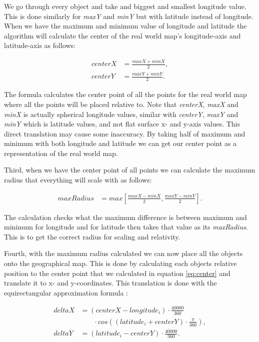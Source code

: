We go through every object and take and biggest and smallest longitude value. This is done similarly for \textit{maxY} and \textit{minY} but with latitude instead of longitude. When we have the maximum and minimum value of longitude and latitude the algorithm will calculate the center of the real world map's longitude-axis and latitude-axis as follows:

\begin{align}
\label{eq:center}
centerX &= \frac{maxX+minX}{2},  \\
centerY &= \frac{maxY+minY}{2}. \nonumber
\end{align}

The formula calculates the center point of all the points for the real world map where all the points will be placed relative to. Note that \textit{centerX}, \textit{maxX} and \textit{minX} is actually spherical longitude values, similar with \textit{centerY}, \textit{maxY} and \textit{minY} which is latitude values, and not flat surface x- and y-axis values. This direct translation may cause some inaccuracy. By taking half of maximum and minimum with both longitude and latitude we can get our center point as a representation of the real world map.
 
Third, when we have the center point of all points we can calculate the maximum radius that everything will scale with as follows:

\begin{align}
\label{eq:radius}
maxRadius &= max[\frac{maxX-minX}{2}, \frac{maxY-minY}{2}].
\end{align}

The calculation checks what the maximum difference is between maximum and minimum for longitude and for latitude then takes that value as its \textit{maxRadius}. This is to get the correct radius for scaling and relativity.

Fourth, with the maximum radius calculated we can now place all the objects onto the geographical map. This is done by calculating each objects relative position to the center point that we calculated in equation \ref{eq:center} and translate it to x- and y-coordinates. This translation is done with the equirectangular approximation formula \cite{equi}:

\begin{align}
\label{eq:equiretangular}
deltaX &= (centerX-longitude_i)\cdot\frac{40000}{360} \\
 &\phantom{b=\,} \cdot cos((latitude_i+centerY) \cdot \frac{\pi}{360}), \nonumber\\
deltaY &= (latitude_i-centerY)\cdot\frac{40000}{360}. \nonumber
\end{align}

